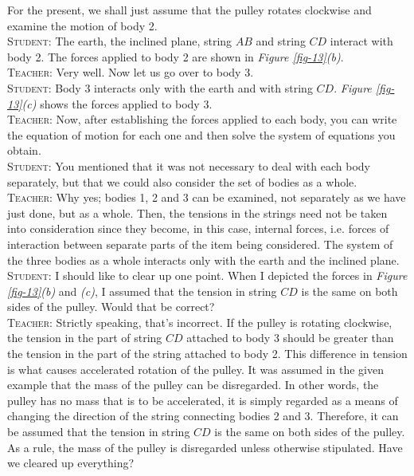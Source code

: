 \documentclass[a4paper,sfsidenotes]{tufte-book}
\begin{document}
For the present, we shall just assume that the pulley rotates clockwise and examine the motion of body 2.
\\
\textsc{Student:} The earth, the inclined plane, string $AB$ and string $CD$ interact with body 2. The forces applied to body 2 are shown in \emph{Figure \ref{fig-13}(b)}.
\\
\textsc{Teacher:} Very well. Now let us go over to body 3.
\\
\textsc{Student:} Body 3 interacts only with the earth and with string $CD$. \emph{Figure \ref{fig-13}(c)} shows the forces applied to body 3.
\\
\textsc{Teacher:} Now, after establishing the forces applied to each body, you can write the equation of motion for each one and then solve the system of equations you obtain.
\\
\textsc{Student:} You mentioned that it was not necessary to deal with each body separately, but that we could also consider the set of bodies as a whole.
\\
\textsc{Teacher:} Why yes; bodies 1, 2 and 3 can be examined, not separately as we have just done, but as a whole. Then, the tensions in the strings need not be taken into consideration since they become, in this case, internal forces, i.e. forces of interaction between separate parts of the item being considered. The system of the three bodies as a whole interacts only with the earth and the inclined plane.
\\
\textsc{Student:} I should like to clear up one point. When I depicted the forces in \emph{Figure \ref{fig-13}(b)} and \emph{(c)}, I assumed that the tension in string $CD$ is the same on both sides of the pulley. Would that be correct?
\\
\textsc{Teacher:} Strictly speaking, that's incorrect. If the pulley is rotating clockwise, the tension in the part of string $CD$ attached to body 3 should be greater than the tension in the part of the string attached to body 2. This difference in tension is what causes accelerated rotation of the pulley. It was
assumed in the given example that the mass of the pulley can be disregarded. In other words, the pulley has no mass that is to be accelerated, it is simply regarded as a means of changing the direction of the string connecting bodies 2 and 3. Therefore, it can be assumed that the tension in string $CD$ is
the same on both sides of the pulley. As a rule, the mass of the pulley is disregarded unless otherwise stipulated. Have we cleared up everything?
\\
\end{document}
